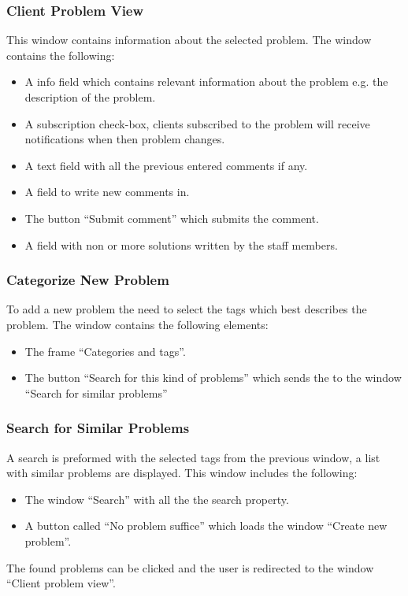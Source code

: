 \subsubsection{Client Problem View}
This window contains information about the selected problem. The window contains the following:
\begin{itemize}
	\item A info field which contains relevant information about the problem e.g. the description of the problem.
	\item A subscription check-box, clients subscribed to the problem will receive notifications when then problem changes. 
	\item A text field with all the previous entered comments if any.
	\item A field to write new comments in.
	\item The button ``Submit comment'' which submits the comment.
	\item A field with non or more solutions written by the staff members.  
\end{itemize}



\subsubsection{Categorize New Problem}
To add a new problem the \aclient[] need to select the tags which best describes the problem. The window contains the following elements:
\begin{itemize}
	\item The frame ``Categories and tags''.
	\item The button ``Search for this kind of problems'' which sends the \aclient[] to the window ``Search for similar problems''
\end{itemize}

\subsubsection{Search for Similar Problems}
A search is preformed with the selected tags from the previous window, a list with similar problems are displayed. This window includes the following: 
\begin{itemize}
	\item The window ``Search'' with all the the search property.
	\item A button called ``No problem suffice'' which loads the window ``Create new problem''.
\end{itemize}
The found problems can be  clicked and the user is redirected to  the window ``Client problem view''. 

